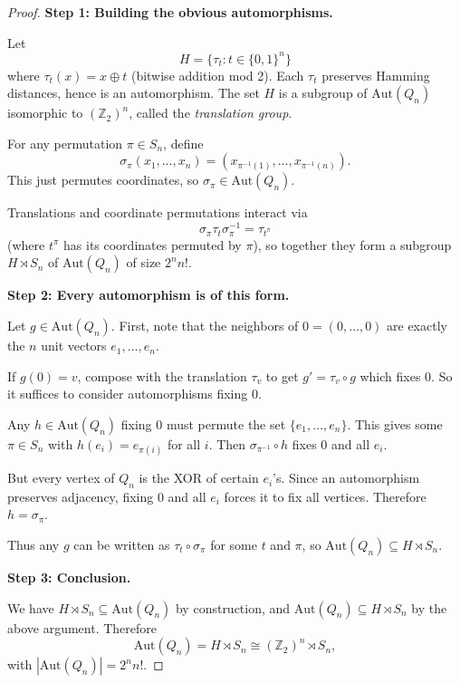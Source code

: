\documentclass[12pt,a4paper,openany]{book}
\begin{document}
\begin{proof}
\textbf{Step 1: Building the obvious automorphisms.}  

Let  
\[
H = \{ \tau_t : t \in \{0,1\}^n \}
\]
where \(\tau_t(x) = x \oplus t\) (bitwise addition mod 2). Each \(\tau_t\) preserves Hamming distances, hence is an automorphism. The set \(H\) is a subgroup of \(\mathrm{Aut}(Q_n)\) isomorphic to \((\mathbb{Z}_2)^n\), called the \emph{translation group}.  

For any permutation \(\pi \in S_n\), define
\[
\sigma_\pi(x_1, \dots, x_n) = (x_{\pi^{-1}(1)}, \dots, x_{\pi^{-1}(n)}).
\]
This just permutes coordinates, so \(\sigma_\pi \in \mathrm{Aut}(Q_n)\).  

Translations and coordinate permutations interact via  
\[
\sigma_\pi \tau_t \sigma_\pi^{-1} = \tau_{t^\pi}
\]
(where \(t^\pi\) has its coordinates permuted by \(\pi\)), so together they form a subgroup \(H \rtimes S_n\) of \(\mathrm{Aut}(Q_n)\) of size \(2^n n!\).

\medskip

\textbf{Step 2: Every automorphism is of this form.}  

Let \(g \in \mathrm{Aut}(Q_n)\). First, note that the neighbors of \(0 = (0, \dots, 0)\) are exactly the \(n\) unit vectors \(e_1, \dots, e_n\).  

If \(g(0) = v\), compose with the translation \(\tau_v\) to get \(g' = \tau_v \circ g\) which fixes \(0\). So it suffices to consider automorphisms fixing \(0\).  

Any \(h \in \mathrm{Aut}(Q_n)\) fixing \(0\) must permute the set \(\{e_1, \dots, e_n\}\). This gives some \(\pi \in S_n\) with \(h(e_i) = e_{\pi(i)}\) for all \(i\). Then \(\sigma_{\pi^{-1}} \circ h\) fixes \(0\) and all \(e_i\).  

But every vertex of \(Q_n\) is the XOR of certain \(e_i\)'s. Since an automorphism preserves adjacency, fixing \(0\) and all \(e_i\) forces it to fix all vertices. Therefore \(h = \sigma_\pi\).  

Thus any \(g\) can be written as \(\tau_t \circ \sigma_\pi\) for some \(t\) and \(\pi\), so \(\mathrm{Aut}(Q_n) \subseteq H \rtimes S_n\).

\medskip

\textbf{Step 3: Conclusion.}  

We have \(H \rtimes S_n \subseteq \mathrm{Aut}(Q_n)\) by construction, and \(\mathrm{Aut}(Q_n) \subseteq H \rtimes S_n\) by the above argument. Therefore
\[
\mathrm{Aut}(Q_n) = H \rtimes S_n \cong (\mathbb{Z}_2)^n \rtimes S_n,
\]
with \(|\mathrm{Aut}(Q_n)| = 2^n n!\).
\end{proof}
\end{document}
